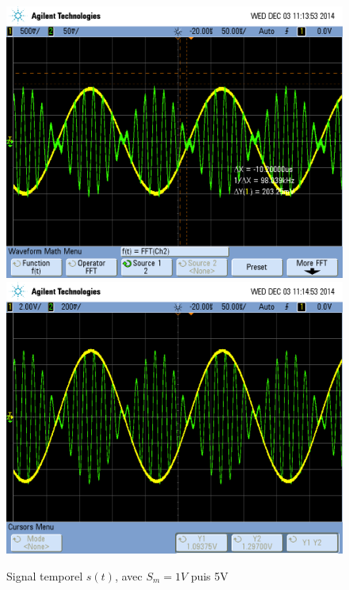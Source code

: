 \documentclass[../../Cours_M1.tex]{subfiles}
\begin{document}
\begin{figure}[h!]
\centering
\includegraphics[scale=0.2]{DBPS1.png}
\includegraphics[scale=0.2]{DBPS5.png}
\caption{Signal temporel $s(t)$, avec $S_m=1V$ puis 5V}
\end{figure}
\end{document}
